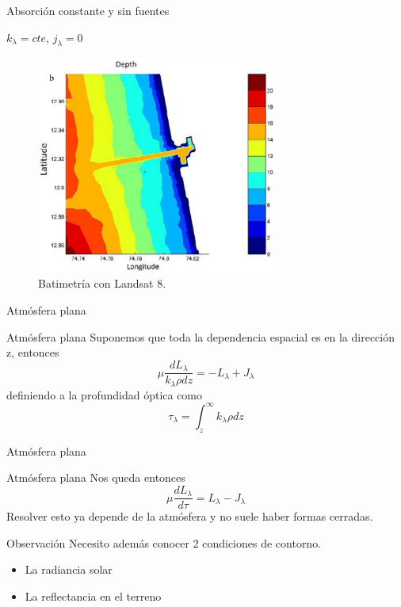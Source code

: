 \documentclass[handout]{beamer}
\begin{document}
\begin{frame}{Absorción constante y sin fuentes}
  \begin{exampleblock}{$k_\lambda = cte$, $j_\lambda = 0$}
    \begin{figure}
    \centering
    \includegraphics[width=0.7\textwidth]{imagenes/bati.png}
      \caption{Batimetría con Landsat 8.}
    \end{figure}
  \end{exampleblock}
\end{frame}

\begin{frame}{Atmósfera plana}
  \begin{exampleblock}{Atmósfera plana}
    Suponemos que toda la dependencia espacial es en la dirección z, entonces
    \begin{equation}
      \mu \frac{dL_\lambda}{k_\lambda \rho dz} = -L_\lambda + J_\lambda
    \end{equation} \pause
    definiendo a la profundidad óptica como
    \begin{equation}
        \tau_\lambda = \int_z^\infty k_\lambda \rho dz
    \end{equation}
  \end{exampleblock}
\end{frame}

\begin{frame}{Atmósfera plana}
  \begin{exampleblock}{Atmósfera plana}
    Nos queda entonces
    \begin{equation}
      \mu \frac{dL_\lambda}{d\tau} = L_\lambda - J_\lambda
    \end{equation}\pause
    Resolver esto ya depende de la atmósfera y no suele haber formas cerradas.
  \end{exampleblock}
  \pause
  \begin{alertblock}{Observación}
    Necesito además conocer 2 condiciones de contorno.
    \begin{itemize}[<+->]
      \item La radiancia solar
      \item La reflectancia en el terreno
    \end{itemize}
  \end{alertblock}
\end{frame}
\end{document}
